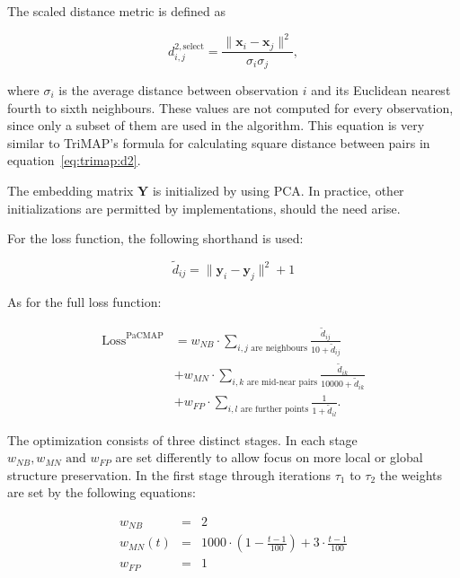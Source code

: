 The scaled distance metric is defined as

\begin{equation}
	\label{eq:pacmap:dselect}
	d^{2,\textrm{select}}_{i,j}=\frac{\|\mathbf{x}_{i}-\mathbf{x}_{j}\|^2}{\sigma_i \sigma_j},
\end{equation}

where $\sigma_i$ is the average distance between observation $i$ and its Euclidean nearest fourth to sixth neighbours. These values are not computed for every observation, since only a subset of them are used in the algorithm. This equation is very similar to TriMAP's formula for calculating square distance between pairs in equation~\eqref{eq:trimap:d2}.

The embedding matrix $\mathbf{Y}$ is initialized by using PCA. In practice, other initializations are permitted by implementations, should the need arise.

For the loss function, the following shorthand is used:

\begin{equation}
	\tilde{d}_{ij} = \|\mathbf{y}_i-\mathbf{y}_j\|^2+1
\end{equation}

As for the full loss function:

\begin{equation}
	\begin{aligned}
		\textrm{Loss}^{\textrm{PaCMAP}} &=
		w_{NB}\cdot\sum_{i,j \text{ are neighbours}}\frac{\tilde{d}_{ij}}{10 + \tilde{d}_{ij}} \\
		& + w_{MN}\cdot\sum_{i,k \text{ are mid-near pairs}}\frac{\tilde{d}_{ik}}{10000 + \tilde{d}_{ik}} \\
		& + w_{FP}\cdot\sum_{i,l \text{ are further points}}\frac{1}{1 + \tilde{d}_{il}}.
	\end{aligned}
\end{equation}

The optimization consists of three distinct stages. In each stage $w_{NB}, w_{MN} \textrm{ and } w_{FP}$ are set differently to allow focus on more local or global structure preservation. In the first stage through iterations $\tau_1$ to $\tau_2$ the weights are set by the following equations:

\begin{equation}
	\begin{aligned}
		w_{NB} & = & 2 \\
		w_{MN}(t) & = & 1000\cdot\left( 1-\frac{t-1}{100} \right) + 3\cdot \frac{t-1}{100} \\
		w_{FP} & = & 1
	\end{aligned}
\end{equation}

